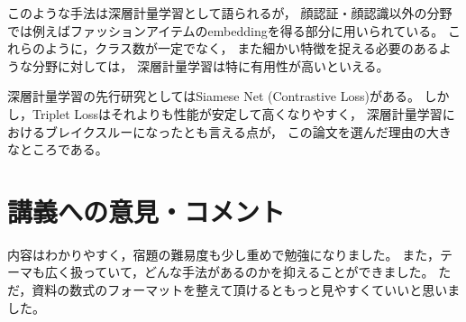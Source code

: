 \documentclass[dvipdfmx, fleqn]{jsarticle}
\begin{document}
このような手法は深層計量学習として語られるが，
顔認証・顔認識以外の分野では例えばファッションアイテムのembeddingを得る部分に用いられている。
これらのように，クラス数が一定でなく，
また細かい特徴を捉える必要のあるような分野に対しては，
深層計量学習は特に有用性が高いといえる。

深層計量学習の先行研究としてはSiamese Net (Contrastive Loss)がある。
しかし，Triplet Lossはそれよりも性能が安定して高くなりやすく，
深層計量学習におけるブレイクスルーになったとも言える点が，
この論文を選んだ理由の大きなところである。



\section{講義への意見・コメント}

内容はわかりやすく，宿題の難易度も少し重めで勉強になりました。
また，テーマも広く扱っていて，どんな手法があるのかを抑えることができました。
ただ，資料の数式のフォーマットを整えて頂けるともっと見やすくていいと思いました。




\end{document}
